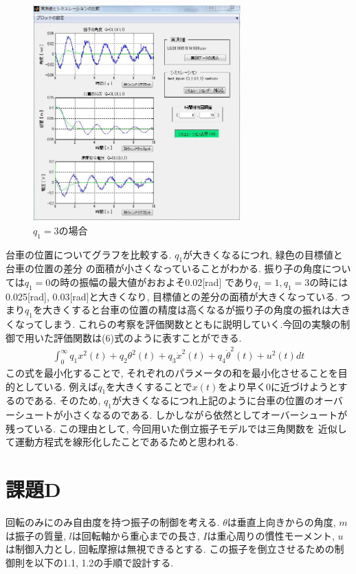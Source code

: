 \documentclass[a4paper,11pt]{jsarticle}
\begin{document}
\begin{figure}[H]
	\begin{center}
		\includegraphics[width=8cm]{比較3.jpg}
		\caption{$q_1=3$の場合}
		\label{$q_1=3$の場合}
	\end{center}
\end{figure}

台車の位置についてグラフを比較する. $q_1$が大きくなるにつれ, 緑色の目標値と台車の位置の差分
の面積が小さくなっていることがわかる.  振り子の角度については$q_1=0$の時の振幅の最大値がおおよそ0.02[rad]
であり$q_1=1,q_1=3$の時には0.025[rad], 0.03[rad]と大きくなり, 目標値との差分の面積が大きくなっている.
つまり$q_1$を大きくすると台車の位置の精度は高くなるが振り子の角度の振れは大きくなってしまう.
これらの考察を評価関数とともに説明していく.今回の実験の制御で用いた評価関数は(6)式のように表すことができる.
\begin{align}
	\int^{\infty}_{0}q_1x^2(t)+q_2\theta^2(t)+q_3\dot{x}^2(t)+q_4\dot{\theta}^2(t)+u^2(t)dt
\end{align}
この式を最小化することで, それぞれのパラメータの和を最小化させることを目的としている.
例えば$q_1$を大きくすることで$x(t)$をより早く0に近づけようとするのである.
そのため, $q_1$が大きくなるにつれ上記のように台車の位置のオーバーシュートが小さくなるのである.
しかしながら依然としてオーバーシュートが残っている. この理由として, 今回用いた倒立振子モデルでは三角関数を
近似して運動方程式を線形化したことであるためと思われる.


\section{課題D}
回転のみにのみ自由度を持つ振子の制御を考える. $\theta$は垂直上向きからの角度, $m$は振子の質量,
$l$は回転軸から重心までの長さ, $I$は重心周りの慣性モーメント, $u$は制御入力とし, 回転摩擦は無視できるとする.
この振子を倒立させるための制御則を以下の1.1, 1.2の手順で設計する.
\end{document}
